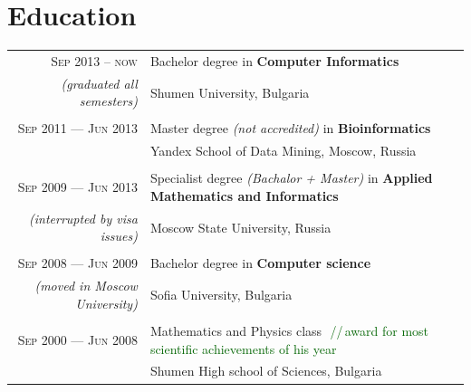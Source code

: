 \documentclass[a4paper,10pt]{article}
\def\myline{\color{linegray}\vline}
\newcommand{\comment}[1]{\small\textcolor{darkgreen}{\,\,//\,#1}}
\begin{document}
\section{Education}
\hspace{-2mm}\begin{tabular}{r!{\myline}p{14cm}}
  \textsc{Sep 2013 -- now}     &  Bachelor degree in \textbf{Computer Informatics}\\
  \small\textit{(graduated all semesters)}  &  Shumen University, Bulgaria\\

        \\
        \textsc{Sep 2011 --- Jun 2013}     &  Master degree {\small\textit{(not accredited)}} in \textbf{Bioinformatics}\\
	                          &  Yandex School of Data Mining, Moscow, Russia\\
	
        \\
        \textsc{Sep 2009 --- Jun 2013}     &  Specialist degree {\small\textit{(Bachalor {\large +} Master)}} in \textbf{Applied Mathematics and Informatics}\\
        \small\textit{(interrupted by visa issues)} & Moscow State University, Russia\\

	\\
	\textsc{Sep 2008 --- Jun 2009}     &  Bachelor degree in \textbf{Computer science}\\
        {\small\textit{(moved in Moscow University)}} &  %
        Sofia University, Bulgaria\\
	
	\\
        \textsc{Sep 2000 --- Jun 2008}     &  Mathematics and Physics class \comment{award for most scientific achievements of his year}\\
                                  &  Shumen High school of Sciences, Bulgaria\\
\end{tabular}
\par\smallskip
\end{document}
